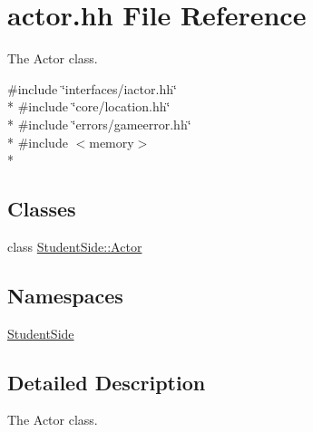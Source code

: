 \hypertarget{actor_8hh}{\section{actor.\-hh File Reference}
\label{actor_8hh}
}


The Actor class.  


{\ttfamily \#include \char`\"{}interfaces/iactor.\-hh\char`\"{}}\\*
{\ttfamily \#include \char`\"{}core/location.\-hh\char`\"{}}\\*
{\ttfamily \#include \char`\"{}errors/gameerror.\-hh\char`\"{}}\\*
{\ttfamily \#include $<$memory$>$}\\*
\subsection*{Classes}
\begin{DoxyCompactItemize}
\item 
class \hyperlink{class_student_side_1_1_actor}{Student\-Side\-::\-Actor}
\end{DoxyCompactItemize}
\subsection*{Namespaces}
\begin{DoxyCompactItemize}
\item 
\hyperlink{namespace_student_side}{Student\-Side}
\end{DoxyCompactItemize}


\subsection{Detailed Description}
The Actor class. 